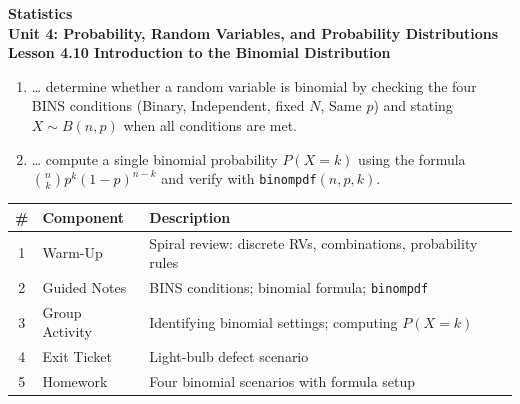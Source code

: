 \documentclass[10pt]{article}
\begin{document}
\vspace{-0.8in}

\begin{center}
  {\color{white}\textbf{\LARGE Statistics}}\\[4pt]
  {\color{skymid}\large\textbf{Unit 4: Probability, Random Variables, and Probability Distributions}}\\[6pt]
  {\color{white}\textbf{\large Lesson 4.10 \quad Introduction to the Binomial Distribution}}
\end{center}

\vspace{0.22in}
\namedateperiod
\vspace{0.18in}

\begin{learningtargetbox}
\small
\begin{enumerate}[leftmargin=1.5em, itemsep=5pt]
  \item \ldots{} determine whether a random variable is binomial by checking the four
        BINS conditions (Binary, Independent, fixed $N$, Same $p$) and stating
        $X \sim B(n, p)$ when all conditions are met.
  \item \ldots{} compute a single binomial probability $P(X = k)$ using the formula
        $\binom{n}{k}p^k(1-p)^{n-k}$ and verify with \texttt{binompdf}$(n,p,k)$.
\end{enumerate}
\end{learningtargetbox}

\vspace{0.14in}

\begin{tocbox}
\small
\renewcommand{\arraystretch}{1.5}
\begin{tabularx}{\linewidth}{@{} c l X @{}}
\rowcolor{sky}
\textbf{\#} & \textbf{Component} & \textbf{Description} \\
\midrule
1 & Warm-Up        & Spiral review: discrete RVs, combinations, probability rules \\
2 & Guided Notes   & BINS conditions; binomial formula; \texttt{binompdf} \\
3 & Group Activity & Identifying binomial settings; computing $P(X=k)$ \\
4 & Exit Ticket    & Light-bulb defect scenario \\
5 & Homework       & Four binomial scenarios with formula setup \\
\end{tabularx}
\end{tocbox}
\end{document}
